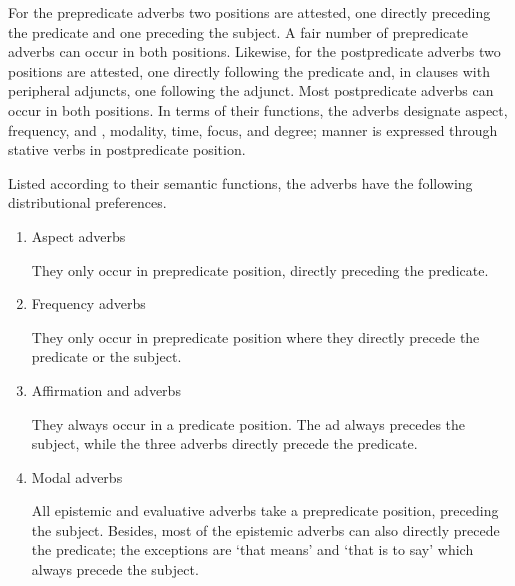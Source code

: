 For the prepredicate adverbs two positions are attested, one directly preceding the predicate and one preceding the subject. A fair number of prepredicate adverbs can occur in both positions. Likewise, for the postpredicate adverbs two positions are attested, one directly following the predicate and, in clauses with peripheral adjuncts, one following the adjunct. Most postpredicate adverbs can occur in both positions. In terms of their functions, the adverbs designate aspect, frequency,  and , modality, time, focus, and degree; manner is expressed through stative verbs in postpredicate position.



Listed according to their semantic functions, the adverbs have the following distributional preferences.

\begin{enumerate}
\item 
Aspect adverbs

\begin{styleIiI}
They only occur in prepredicate position, directly preceding the predicate.
\end{styleIiI}


\item 
Frequency adverbs

\begin{styleIiI}
They only occur in prepredicate position where they directly precede the predicate or the subject.
\end{styleIiI}


\item 
Affirmation and  adverbs

\begin{styleIiI}
They always occur in a predicate position. The  ad always precedes the subject, while the three  adverbs directly precede the predicate.
\end{styleIiI}


\item 
Modal adverbs

\begin{styleIiI}
All epistemic and evaluative adverbs take a prepredicate position, preceding the subject. Besides, most of the epistemic adverbs can also directly precede the predicate; the exceptions are  ‘that means’ and  ‘that is to say’ which always precede the subject.
\end{styleIiI}



\end{enumerate}
